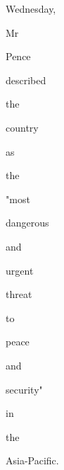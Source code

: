 \documentclass[varwidth]{standalone}
\begin{document}
{{{\colorbox{red!78.65168539325843}{\strut Wednesday,} \colorbox{red!79.7752808988764}{\strut Mr} \colorbox{red!80.89887640449437}{\strut Pence} \colorbox{red!82.02247191011236}{\strut described} \colorbox{red!83.14606741573034}{\strut the} \colorbox{red!84.26966292134831}{\strut country} \colorbox{red!85.39325842696628}{\strut as} \colorbox{red!86.51685393258427}{\strut the} \colorbox{red!87.64044943820225}{\strut "most} \colorbox{red!88.76404494382022}{\strut dangerous} \colorbox{red!89.8876404494382}{\strut and} \colorbox{red!91.01123595505618}{\strut urgent} \colorbox{red!92.13483146067416}{\strut threat} \colorbox{red!93.25842696629213}{\strut to} \colorbox{red!94.3820224719101}{\strut peace} \colorbox{red!95.50561797752809}{\strut and} \colorbox{red!96.62921348314607}{\strut security"} \colorbox{red!97.75280898876404}{\strut in} \colorbox{red!98.87640449438202}{\strut the} \colorbox{red!100.0}{\strut Asia-Pacific.} 
}}}
\end{document}
